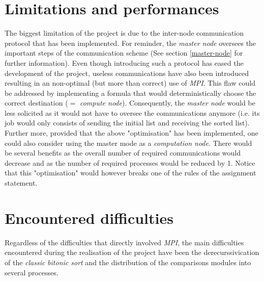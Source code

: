 \documentclass[a4paper,11pt]{article}
\begin{document}
\section{Limitations and performances}

  The biggest limitation of the project is due to the inter-node communication protocol that has been implemented. For reminder, the \textit{master node} oversees the important steps of the communication scheme (See section \ref{master-node} for further information).
  Even though introducing such a protocol has eased the development of the project, useless communications have also been introduced resulting in an non-optimal (but more than correct) use of \textit{MPI}.
  This flaw could be addressed by implementing a formula that would deterministically choose the correct destination ($=$ \textit{compute node}). Consequently, the \textit{master node} would be less solicited as it would not have to oversee the communications anymore (i.e. its job would only consists of sending the initial list and receiving the sorted list).\\
  
  \noindent Further more, provided that the above "optimisation" has been implemented, one could also consider using the master mode as a \textit{computation node}. There would be several benefits as the overall number of required communications would decrease and as the number of required processes would be reduced by 1. Notice that this "optimisation" would however breaks one of the rules of the assignment statement.

\section{Encountered difficulties}

  Regardless of the difficulties that directly involved \textit{MPI}, the main difficulties encountered during the realisation of the project have been the derecurssivication of the \textit{classic} \textit{bitonic sort} and the distribution of the comparisons modules into several processes. 
\end{document}
